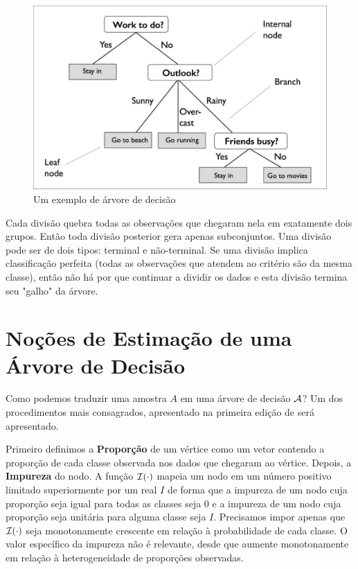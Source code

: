 \begin{figure}
    \centering
    \includegraphics[scale = .25]{imagens/arvore.png}
    \caption{Um exemplo de árvore de decisão}
    \label{fig:arvore}
\end{figure}

Cada divisão quebra todas as observações que chegaram nela em exatamente dois grupos. Então toda divisão posterior gera apenas subconjuntos. Uma divisão pode ser de dois tipos: terminal e não-terminal. Se uma divisão implica classificação perfeita (todas as observações que atendem ao critério são da mesma classe), então não há por que continuar a dividir os dados e esta divisão termina seu "galho" da árvore. 


\section{Noções de Estimação de uma Árvore de Decisão}

Como podemos traduzir uma amostra $A$ em uma árvore de decisão $\mathcal{A}$? Um dos procedimentos mais consagrados, apresentado na primeira edição de  será apresentado.

Primeiro definimos a \textbf{Proporção} de um vértice como um vetor contendo a proporção de cada classe observada nos dados que chegaram ao vértice. Depois, a \textbf{Impureza} do nodo. A função $\mathcal{I}(\cdot)$ mapeia um nodo em um número positivo limitado superiormente por um real $I$ de forma que a impureza de um nodo cuja proporção seja igual para todas as classes seja $0$ e a impureza de um nodo cuja proporção seja unitária para alguma classe seja $I$. Precisamos impor apenas que $\mathcal{I}(\cdot)$ seja monotonamente crescente em relação à probabilidade de cada classe. O valor específico da impureza não é relevante, desde que aumente monotonamente em relação à heterogeneidade de proporções observadas.

